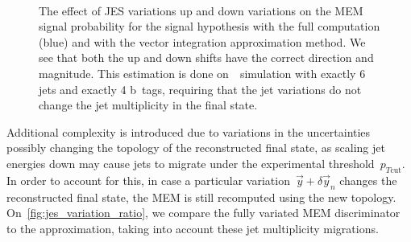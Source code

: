 \begin{figure}[ht]
\begin{centering}
\\
\caption[The distributions of the MEM signal and background probabilities]{The effect of JES variations up and down variations on the MEM signal probability for the signal hypothesis with the full computation (blue) and with the vector integration approximation method. We see that both the up and down shifts have the correct direction and magnitude. This estimation is done on~\ttHbb~simulation with exactly 6 jets and exactly 4 b~tags, requiring that the jet variations do not change the jet multiplicity in the final state.}
\label{fig:jes_variation}
\end{centering}
\end{figure}

Additional complexity is introduced due to variations in the uncertainties possibly changing the topology of the reconstructed final state, as scaling jet energies down may cause jets to migrate under the experimental threshold~$p_{T\mathrm{cut}}$. In order to account for this, in case a particular variation~$\vec{y} + \delta \vec{y}_n$ changes the reconstructed final state, the MEM is still recomputed using the new topology. On~\cref{fig:jes_variation_ratio}, we compare the fully variated MEM discriminator to the approximation, taking into account these jet multiplicity migrations.

